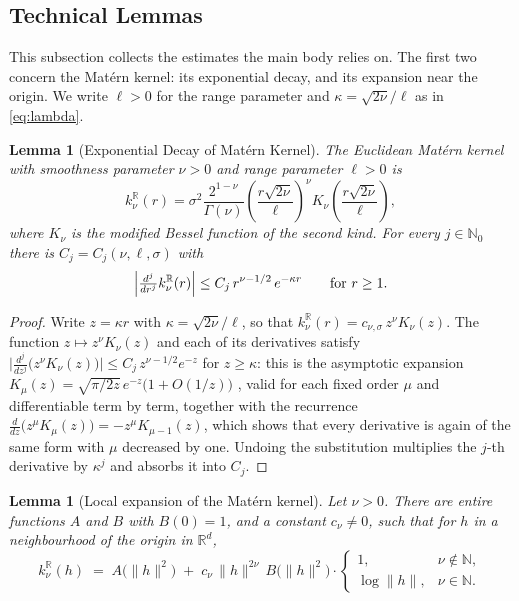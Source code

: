 \documentclass[pdflatex,sn-mathphys,Numbered]{sn-jnl}
\theoremstyle{thmstyleone}%
\newtheorem{lemma}[theorem]{Lemma}%
\theoremstyle{thmstyletwo}%
\theoremstyle{thmstylethree}%
\newcommand{\RR}{\mathbb{R}}
\newcommand{\NN}{\mathbb{N}}
\begin{document}
\begin{appendices}
\subsection{Technical Lemmas}
\label{subsec:technical}

This subsection collects the estimates the main body relies on. The first two
concern the Mat\'ern kernel: its exponential decay, and its expansion near the
origin. We write $\ell>0$ for the range
parameter and $\kappa = \sqrt{2\nu}/\ell$ as in \eqref{eq:lambda}.

\begin{lemma}[Exponential Decay of Mat\'ern Kernel]
\label{lemma:matern-decay}
The Euclidean Mat\'ern kernel with smoothness parameter $\nu > 0$ and range
parameter $\ell > 0$ is
$$k^{\RR}_\nu(r) = \sigma^2 \frac{2^{1-\nu}}{\Gamma(\nu)} \left(\frac{r\sqrt{2\nu}}{\ell}\right)^\nu K_\nu\left(\frac{r\sqrt{2\nu}}{\ell}\right),$$
where $K_\nu$ is the modified Bessel function of the second kind. For every
$j \in \NN_0$ there is $C_j = C_j(\nu,\ell,\sigma)$ with
$$\Bigl|\tfrac{d^j}{dr^j}k^{\RR}_\nu(r)\Bigr| \leq C_j \, r^{\nu-1/2} \, e^{-\kappa r}
\qquad \text{for } r \geq 1 .$$
\end{lemma}

\begin{proof}
Write $z = \kappa r$ with $\kappa = \sqrt{2\nu}/\ell$, so that
$k^{\RR}_\nu(r) = c_{\nu,\sigma}\, z^\nu K_\nu(z)$. The function
$z \mapsto z^\nu K_\nu(z)$ and each of its derivatives satisfy
$\bigl|\tfrac{d^j}{dz^j}\bigl(z^\nu K_\nu(z)\bigr)\bigr| \leq C_j\,
z^{\nu-1/2}e^{-z}$ for $z \geq \kappa$: this is the asymptotic expansion
$K_\mu(z) = \sqrt{\pi/2z}\,e^{-z}\bigl(1+O(1/z)\bigr)$ \cite{dlmf}, valid for
each fixed order $\mu$ and differentiable term by term, together with the
recurrence
$\tfrac{d}{dz}\bigl(z^\mu K_\mu(z)\bigr) = -z^{\mu}K_{\mu-1}(z)$, which shows
that every derivative is again of the same form with $\mu$ decreased by one.
Undoing the substitution multiplies the $j$-th derivative by $\kappa^{j}$ and
absorbs it into $C_j$.
\end{proof}

\begin{lemma}[Local expansion of the Mat\'ern kernel]
\label{lem:matern-expansion}
Let $\nu > 0$. There are entire functions $A$ and $B$ with $B(0) = 1$, and a
constant $c_\nu \neq 0$, such that for $h$ in a neighbourhood of the origin in
$\RR^d$,
\[
    k^{\RR}_\nu(h) \;=\; A\bigl(\|h\|^2\bigr) \;+\;
    c_\nu\,\|h\|^{2\nu}\,B\bigl(\|h\|^2\bigr) \cdot
    \begin{cases}
        1, & \nu \notin \NN, \\
        \log\|h\|, & \nu \in \NN .
    \end{cases}
\]
\end{lemma}


\end{appendices}
\end{document}
